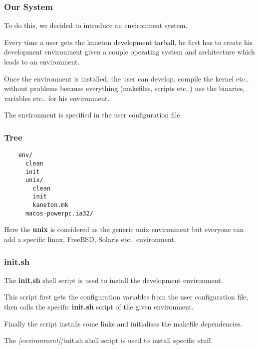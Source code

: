 \documentclass[8pt]{beamer}
\newcommand{\nl}[0]{\vspace{0.4cm}}
\begin{document}

\begin{frame}
  \frametitle{Our System}

  To do this, we decided to introduce an environment system.

  \nl

  Every time a user gets the kaneton development tarball, he first has to
  create his development environment given a couple operating system and
  architecture which leads to an environment.

  \nl

  Once the environment is installed, the user can develop, compile the kernel
  etc.. without problems because everything (makefiles, scripts etc..) use
  the binaries, variables etc.. for his environment.

  \nl

  The environment is specified in the user configuration file.
\end{frame}


\begin{frame}[containsverbatim]
  \frametitle{Tree}

  \begin{verbatim}
    env/
      clean
      init
      unix/
        clean
        init
        kaneton.mk
      macos-powerpc.ia32/
  \end{verbatim}

  \nl

  Here the \textbf{unix} is considered as the generic unix
  environment but everyone can add a specific linux, FreeBSD, Solaris etc..
  environment.
\end{frame}


\begin{frame}
  \frametitle{init.sh}

  The \textbf{init.sh} shell script is used to install the development
  environment.

  \nl

  This script first gets the configuration variables from the user
  configuration file, then calls the specific \textbf{init.sh} script
  of the given environment.

  \nl

  Finally the script installs some links and initialises the makefile
  dependencies.

  \nl

  The \textit{[environment]}/init.sh shell script is used to install
  specific stuff.
\end{frame}
\end{document}
